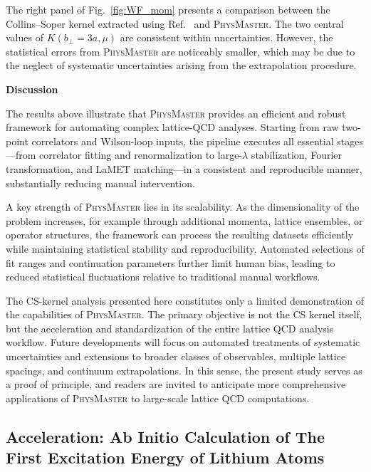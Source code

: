 \documentclass[11pt, a4paper, logo, copyright, nonumbering]{SAI}
\newcommand{\agent}{\textsc{PhysMaster}\xspace}
\begin{document}
The right panel of Fig.~\ref{fig:WF_mom} presents a comparison between the Collins--Soper kernel extracted using Ref.~\cite{Tan:2025ofx} and \agent. The two central values of $K(b_\perp{=}3a,\mu)$ are consistent within uncertainties. However, the statistical errors from \agent are noticeably smaller, which may be due to the neglect of systematic uncertainties arising from the extrapolation procedure.




\noindent \textbf{Discussion}

The results above illustrate that \agent provides an efficient and robust framework
for automating complex lattice-QCD analyses.
Starting from raw two-point correlators and Wilson-loop inputs,
the pipeline executes all essential stages—from correlator fitting and renormalization
to large-$\lambda$ stabilization, Fourier transformation, and LaMET matching—in a
consistent and reproducible manner, substantially reducing manual intervention.

A key strength of \agent lies in its scalability.
As the dimensionality of the problem increases, for example through additional
momenta, lattice ensembles, or operator structures, the framework can process
the resulting datasets efficiently while maintaining statistical stability and
reproducibility.
Automated selections of fit ranges and continuation parameters further limit
human bias, leading to reduced statistical fluctuations relative to traditional
manual workflows.

The CS-kernel analysis presented here constitutes only a limited demonstration
of the capabilities of \agent.
The primary objective is not the CS kernel itself, but the acceleration and
standardization of the entire lattice QCD analysis workflow.
Future developments will focus on automated treatments of systematic uncertainties
and extensions to broader classes of observables, multiple lattice spacings,
and continuum extrapolations.
In this sense, the present study serves as a proof of principle, and readers are
invited to anticipate more comprehensive applications of \agent to large-scale
lattice QCD computations.





\subsection{Acceleration: Ab Initio Calculation of The First Excitation Energy of Lithium Atoms}
\end{document}
